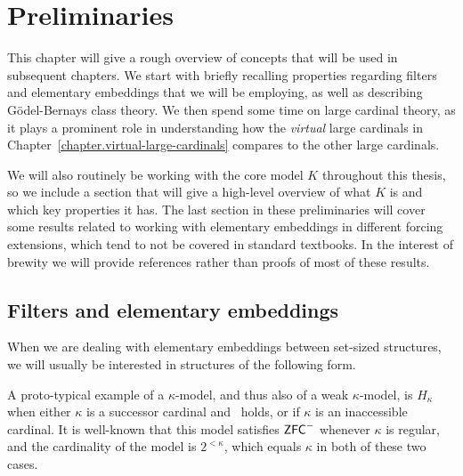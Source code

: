 \documentclass[../../main]{subfiles}
\begin{document}
\chapter{Preliminaries}
\thispagestyle{fancy}

This chapter will give a rough overview of concepts that will be used in subsequent chapters. We start with briefly recalling properties regarding filters and elementary embeddings that we will be employing, as well as describing \gbc\, G\"odel-Bernays class theory. We then spend some time on large cardinal theory, as it plays a prominent role in understanding how the \textit{virtual} large cardinals in Chapter~\ref{chapter.virtual-large-cardinals} compares to the other large cardinals.

We will also routinely be working with the core model $K$ throughout this thesis, so we include a section that will give a high-level overview of what $K$ is and which key properties it has. The last section in these preliminaries will cover some results related to working with elementary embeddings in different forcing extensions, which tend to not be covered in standard textbooks. In the interest of brewity we will provide references rather than proofs of most of these results.


\section{Filters and elementary embeddings}
\label{prelims.filters}

When we are dealing with elementary embeddings between set-sized structures, we will usually be interested in structures of the following form.


A proto-typical example of a $\kappa$-model, and thus also of a weak $\kappa$-model, is $H_\kappa$ when either $\kappa$ is a successor cardinal and \gch\ holds, or if $\kappa$ is an inaccessible cardinal. It is well-known that this model satisfies $\textsf{ZFC}^-$ whenever $\kappa$ is regular, and the cardinality of the model is $2^{<\kappa}$, which equals $\kappa$ in both of these two cases.
\end{document}
